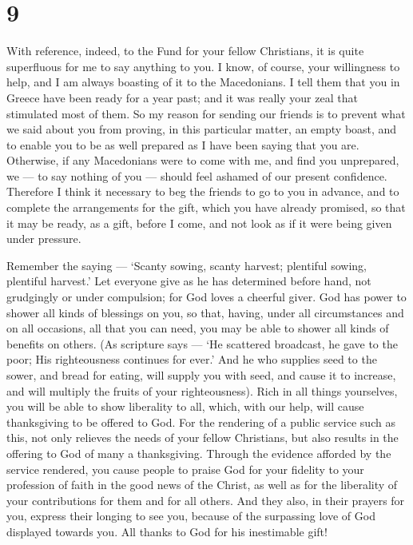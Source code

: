 \hypertarget{section-7}{%
\section{9}\label{section-7}}

 With reference, indeed, to the Fund for your fellow
Christians, it is quite superfluous for me to say anything to you.
 I know, of course, your willingness to help, and I am
always boasting of it to the Macedonians. I tell them that you in Greece
have been ready for a year past; and it was really your zeal that
stimulated most of them.  So my reason for sending our
friends is to prevent what we said about you from proving, in this
particular matter, an empty boast, and to enable you to be as well
prepared as I have been saying that you are.  Otherwise, if
any Macedonians were to come with me, and find you unprepared, we --- to
say nothing of you --- should feel ashamed of our present confidence.
 Therefore I think it necessary to beg the friends to go to
you in advance, and to complete the arrangements for the gift, which you
have already promised, so that it may be ready, as a gift, before I
come, and not look as if it were being given under pressure.

 Remember the saying --- `Scanty sowing, scanty harvest;
plentiful sowing, plentiful harvest.'  Let everyone give as
he has determined before hand, not grudgingly or under compulsion; for
God loves a cheerful giver.  God has power to shower all
kinds of blessings on you, so that, having, under all circumstances and
on all occasions, all that you can need, you may be able to shower all
kinds of benefits on others.  (As scripture says --- `He
scattered broadcast, he gave to the poor; His righteousness continues
for ever.'  And he who supplies seed to the sower, and
bread for eating, will supply you with seed, and cause it to increase,
and will multiply the fruits of your righteousness).  Rich
in all things yourselves, you will be able to show liberality to all,
which, with our help, will cause thanksgiving to be offered to God.
 For the rendering of a public service such as this, not
only relieves the needs of your fellow Christians, but also results in
the offering to God of many a thanksgiving.  Through the
evidence afforded by the service rendered, you cause people to praise
God for your fidelity to your profession of faith in the good news of
the Christ, as well as for the liberality of your contributions for them
and for all others.  And they also, in their prayers for
you, express their longing to see you, because of the surpassing love of
God displayed towards you.  All thanks to God for his
inestimable gift!

